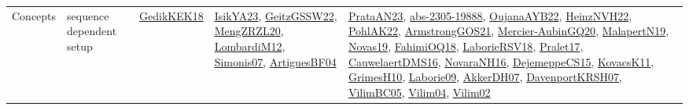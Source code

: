 {\begin{longtable}{llp{6cm}p{6cm}p{6cm}}
Concepts & sequence dependent setup & \href{articles/GedikKEK18.pdf}{GedikKEK18}\cite{GedikKEK18} & \href{articles/IsikYA23.pdf}{IsikYA23}\cite{IsikYA23}, \href{papers/GeitzGSSW22.pdf}{GeitzGSSW22}\cite{GeitzGSSW22}, \href{articles/MengZRZL20.pdf}{MengZRZL20}\cite{MengZRZL20}, \href{articles/LombardiM12.pdf}{LombardiM12}\cite{LombardiM12}, \href{articles/Simonis07.pdf}{Simonis07}\cite{Simonis07}, \href{papers/ArtiguesBF04.pdf}{ArtiguesBF04}\cite{ArtiguesBF04} & \href{articles/PrataAN23.pdf}{PrataAN23}\cite{PrataAN23}, \href{articles/abs-2305-19888.pdf}{abs-2305-19888}\cite{abs-2305-19888}, \href{papers/OujanaAYB22.pdf}{OujanaAYB22}\cite{OujanaAYB22}, \href{articles/HeinzNVH22.pdf}{HeinzNVH22}\cite{HeinzNVH22}, \href{articles/PohlAK22.pdf}{PohlAK22}\cite{PohlAK22}, \href{papers/ArmstrongGOS21.pdf}{ArmstrongGOS21}\cite{ArmstrongGOS21}, \href{papers/Mercier-AubinGQ20.pdf}{Mercier-AubinGQ20}\cite{Mercier-AubinGQ20}, \href{papers/MalapertN19.pdf}{MalapertN19}\cite{MalapertN19}, \href{articles/Novas19.pdf}{Novas19}\cite{Novas19}, \href{articles/FahimiOQ18.pdf}{FahimiOQ18}\cite{FahimiOQ18}, \href{articles/LaborieRSV18.pdf}{LaborieRSV18}\cite{LaborieRSV18}, \href{papers/Pralet17.pdf}{Pralet17}\cite{Pralet17}, \href{papers/CauwelaertDMS16.pdf}{CauwelaertDMS16}\cite{CauwelaertDMS16}, \href{articles/NovaraNH16.pdf}{NovaraNH16}\cite{NovaraNH16}, \href{papers/DejemeppeCS15.pdf}{DejemeppeCS15}\cite{DejemeppeCS15}, \href{articles/KovacsK11.pdf}{KovacsK11}\cite{KovacsK11}, \href{papers/GrimesH10.pdf}{GrimesH10}\cite{GrimesH10}, \href{papers/Laborie09.pdf}{Laborie09}\cite{Laborie09}, \href{papers/AkkerDH07.pdf}{AkkerDH07}\cite{AkkerDH07}, \href{papers/DavenportKRSH07.pdf}{DavenportKRSH07}\cite{DavenportKRSH07}, \href{articles/VilimBC05.pdf}{VilimBC05}\cite{VilimBC05}, \href{papers/Vilim04.pdf}{Vilim04}\cite{Vilim04}, \href{papers/Vilim02.pdf}{Vilim02}\cite{Vilim02}\\

\end{longtable}}
